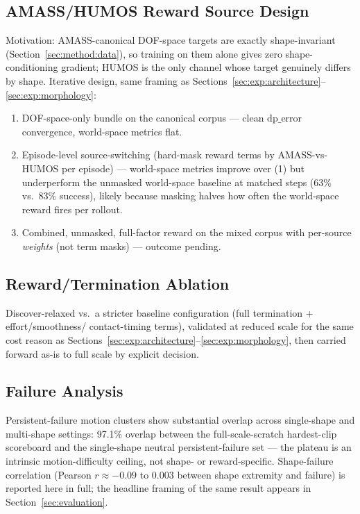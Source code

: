 \subsection{AMASS/HUMOS Reward Source Design}
\label{sec:exp:reward-source}

Motivation: AMASS-canonical DOF-space targets are exactly shape-invariant
(Section~\ref{sec:method:data}), so training on them alone gives zero shape-conditioning gradient;
HUMOS is the only channel whose target genuinely differs by shape. Iterative design, same framing
as Sections~\ref{sec:exp:architecture}--\ref{sec:exp:morphology}:
\begin{enumerate}
  \item DOF-space-only bundle on the canonical corpus — clean $\mathrm{dp\_error}$ convergence,
  world-space metrics flat.
  \item Episode-level source-switching (hard-mask reward terms by AMASS-vs-HUMOS per episode) —
  world-space metrics improve over (1) but underperform the unmasked world-space baseline at
  matched steps (63\% vs.\ 83\% success), likely because masking halves how often the world-space
  reward fires per rollout.
  \item Combined, unmasked, full-factor reward on the mixed corpus with per-source \emph{weights}
  (not term masks) — outcome pending.
\end{enumerate}

\subsection{Reward/Termination Ablation}
\label{sec:exp:reward-term-ablation}

Discover-relaxed vs.\ a stricter baseline configuration (full termination + effort/smoothness/
contact-timing terms), validated at reduced scale for the same cost reason as
Sections~\ref{sec:exp:architecture}--\ref{sec:exp:morphology}, then carried forward as-is to full
scale by explicit decision.

\subsection{Failure Analysis}
\label{sec:exp:failure}

Persistent-failure motion clusters show substantial overlap across single-shape and multi-shape
settings: 97.1\% overlap between the full-scale-scratch hardest-clip scoreboard and the
single-shape neutral persistent-failure set — the plateau is an intrinsic motion-difficulty
ceiling, not shape- or reward-specific. Shape-failure correlation (Pearson $r \approx -0.09$ to
$0.003$ between shape extremity and failure) is reported here in full; the headline framing of the
same result appears in Section~\ref{sec:evaluation}.

